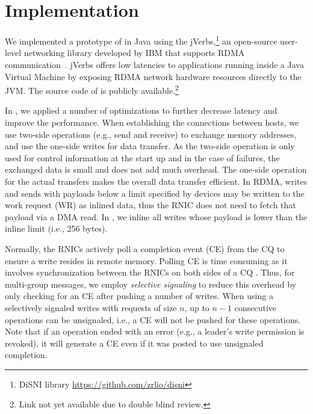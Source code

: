 \section{Implementation}
\label{sec:implementation}

%

We implemented a prototype of \libname in Java using the jVerbs,\footnote{DiSNI
library \url{https://github.com/zrlio/disni}} an
open-source user-level networking library developed by IBM that supports RDMA
communication~\cite{stuedi2013jverbs}. jVerbs offers low latencies to applications running inside a Java
Virtual Machine by exposing RDMA network hardware resources directly to the JVM.
The source code of \libname is publicly available.\footnote{Link not yet available due to double blind review.}

In \libname, we applied a number of optimizations to further decrease latency
and improve the performance. When establishing the connections between hosts, we
use two-side operations (e.g., send and receive) to exchange memory addresses, and
use the one-side writes for data transfer. As the two-side operation is only
used for control information at the start up and in the case of failures, the exchanged data is
small and does not add much overhead. The one-side operation for the actual
transfers makes the overall data transfer efficient. In RDMA, writes and sends
with payloads below a limit specified by devices may be written to the work
request (WR) as inlined data, thus the RNIC does not need to fetch that payload
via a DMA read. In \libname, we inline all writes whose payload is lower than
the inline limit (i.e., 256 bytes).

Normally, the RNICs actively poll a completion event (CE) from the CQ to ensure
a write resides in remote memory. Polling CE is time consuming as it involves
synchronization between the RNICs on both sides of a CQ \cite{APUS}. Thus,
for multi-group messages, we
employ \emph{selective signaling} \cite{Kalia2014} to reduce this overhead by
only checking for an CE after pushing a number of writes. When using a
selectively signaled writes with requests of size $n$, up to $n-1$ consecutive
operations can be unsignaled, i.e., a CE will not be pushed for these
operations. Note that if an operation ended with an error (e.g., a leader's
write permission is revoked), it will generate a CE even if it was posted to use
unsignaled completion.

